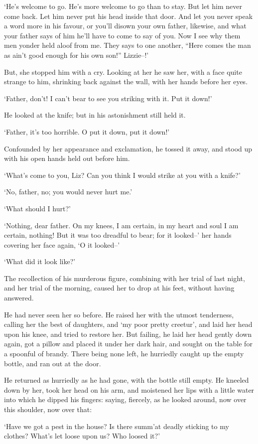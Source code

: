 ‘He’s welcome to go. He’s more welcome to go than to stay. But let him
never come back. Let him never put his head inside that door. And let
you never speak a word more in his favour, or you’ll disown your own
father, likewise, and what your father says of him he’ll have to come to
say of you. Now I see why them men yonder held aloof from me. They says
to one another, “Here comes the man as ain’t good enough for his own
son!” Lizzie--!’

But, she stopped him with a cry. Looking at her he saw her, with a face
quite strange to him, shrinking back against the wall, with her hands
before her eyes.

‘Father, don’t! I can’t bear to see you striking with it. Put it down!’

He looked at the knife; but in his astonishment still held it.

‘Father, it’s too horrible. O put it down, put it down!’

Confounded by her appearance and exclamation, he tossed it away, and
stood up with his open hands held out before him.

‘What’s come to you, Liz? Can you think I would strike at you with a
knife?’

‘No, father, no; you would never hurt me.’

‘What should I hurt?’

‘Nothing, dear father. On my knees, I am certain, in my heart and soul
I am certain, nothing! But it was too dreadful to bear; for it looked--’
her hands covering her face again, ‘O it looked--’

‘What did it look like?’

The recollection of his murderous figure, combining with her trial of
last night, and her trial of the morning, caused her to drop at his
feet, without having answered.

He had never seen her so before. He raised her with the utmost
tenderness, calling her the best of daughters, and ‘my poor pretty
creetur’, and laid her head upon his knee, and tried to restore her. But
failing, he laid her head gently down again, got a pillow and placed it
under her dark hair, and sought on the table for a spoonful of brandy.
There being none left, he hurriedly caught up the empty bottle, and ran
out at the door.

He returned as hurriedly as he had gone, with the bottle still empty.
He kneeled down by her, took her head on his arm, and moistened her lips
with a little water into which he dipped his fingers: saying, fiercely,
as he looked around, now over this shoulder, now over that:

‘Have we got a pest in the house? Is there summ’at deadly sticking to my
clothes? What’s let loose upon us? Who loosed it?’


